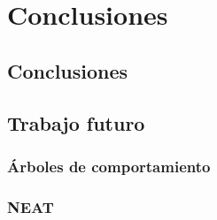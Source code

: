 \chapter{Conclusiones}

\section{Conclusiones}

\section{Trabajo futuro}

\subsection{Árboles de comportamiento}

\subsection{NEAT}
